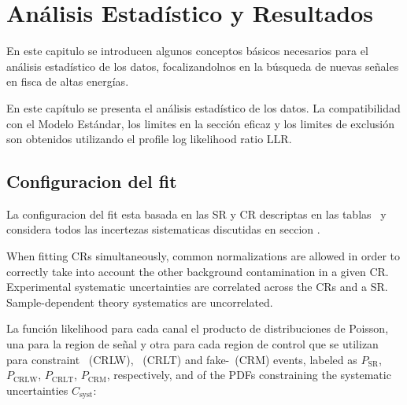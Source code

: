 \chapter{An\'alisis Estad\'istico y Resultados}

En este capitulo se introducen algunos conceptos básicos necesarios para el análisis
estadístico de los datos, focalizandolnos en la búsqueda de nuevas se\~nales en fisca de altas
energías.

En este capítulo se presenta el análisis estadístico de los datos. La compatibilidad con el Modelo Estándar,
los limites en la sección eficaz y los limites de exclusión son obtenidos utilizando el profile log likelihood ratio {LLR}.




\section{Configuracion del fit} \label{sec:fitconfig}

La configuracion del fit esta basada en las SR y CR descriptas en las tablas \XXX\ y
considera todos las incertezas sistematicas discutidas en seccion \XXX.

When fitting CRs simultaneously, common normalizations are allowed in order to correctly take into
account the other background contamination in a given CR. Experimental systematic uncertainties are
correlated across the CRs and a SR. Sample-dependent theory systematics are uncorrelated.

La función likelihood para cada canal el producto de distribuciones de Poisson, una para la region
de se\~nal y otra para cada region de control que se utilizan para constraint \wgamma\ (CRLW),
\ttbargam\ (CRLT) and fake-\MET\ (CRM) events, labeled as $P_\text{SR}$, $P_\text{CRLW}$,
$P_\text{CRLT}$, $P_\text{CRM}$, respectively, and of the PDFs constraining the systematic
uncertainties $C_\text{syst}$:


